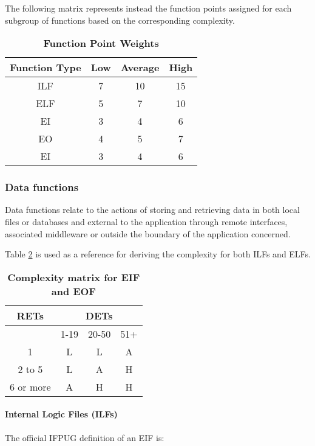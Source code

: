 The following matrix represents instead the function points assigned for each subgroup of functions based on the corresponding complexity.

\begin{longtable}{| c | c | c | c |}
	\caption{\textbf{Function Point Weights}} %
	\label{tab:fp_weights}%
	\\ \hline
	
	\textbf{Function Type} & \textbf{Low} & \textbf{Average} & \textbf{High}\\ \hline
	ILF & 7 & 10 & 15\\ \hline
	ELF & 5 & 7 & 10\\ \hline
	EI & 3 & 4 & 6\\ \hline
	EO & 4 & 5 & 7\\ \hline
	EI & 3 & 4 & 6\\ \hline	
\end{longtable}

\subsubsection{Data functions}
Data functions relate to the actions of storing and retrieving data in both local files or databases and external to the application through remote interfaces, associated middleware or outside the boundary of the application concerned.

Table \ref{tab:ilf_elf_complexity_matrix} is used as a reference for deriving the complexity for both ILFs and ELFs.
\clearpage

\begin{longtable}{| c | c | c | c |}
	\caption{\textbf{Complexity matrix for EIF and EOF}} %
	\label{tab:ilf_elf_complexity_matrix}
	\\ \hline
	
	\textbf{RETs} &	\multicolumn{3}{c|}{\textbf{DETs}} \\ \hline
	  & 1-19 & 20-50 & 51+\\ \hline 
	1 & L & L & A\\ \hline 
	2 to 5 & L & A & H\\ \hline 
	6 or more & A & H & H \\ \hline 
\end{longtable}

\paragraph{Internal Logic Files (ILFs)}
The official IFPUG definition of an EIF is:

